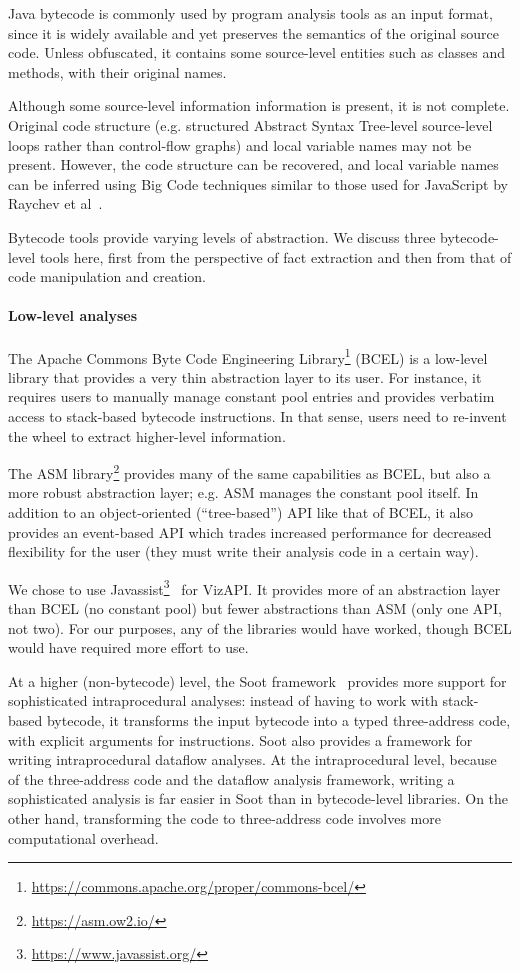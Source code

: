 Java bytecode is commonly used by program analysis tools as an input
format, since it is widely available and yet preserves the semantics
of the original source code. Unless obfuscated, it contains some
source-level entities such as classes and methods, with their original
names.

Although some source-level information information is present, it is
not complete. Original code structure (e.g. structured Abstract Syntax
Tree-level source-level loops rather than control-flow graphs) and
local variable names may not be present. However, the code structure
can be recovered, and local variable names can be inferred using Big
Code techniques similar to those used for JavaScript by Raychev et
al~\cite{raychev2016learning}.

Bytecode tools provide varying levels of abstraction. We discuss three
bytecode-level tools here, first from the perspective of fact extraction
and then from that of code manipulation and creation.

\paragraph{Low-level analyses}
The Apache Commons Byte Code Engineering Library\footnote{\url{https://commons.apache.org/proper/commons-bcel/}} (BCEL) is a low-level library that
provides a very thin abstraction layer to its user. For instance,
it requires users to manually manage constant pool entries and provides
verbatim access to stack-based bytecode instructions. In that sense,
users need to re-invent the wheel to extract higher-level information.

The ASM library\footnote{\url{https://asm.ow2.io/}} provides many of
the same capabilities as BCEL, but also a more robust
abstraction layer; e.g. ASM manages the constant pool
itself. In addition to an object-oriented (``tree-based'') API like
that of BCEL, it also provides an event-based API which trades increased
performance for decreased flexibility for the user (they must write
their analysis code in a certain way).

We chose to use
Javassist\footnote{\url{https://www.javassist.org/}}~\cite{chiba00:_load_struc_reflec_java}
for VizAPI. It provides more of an abstraction layer than BCEL (no
constant pool) but fewer abstractions than ASM (only one API, not
two). For our purposes, any of the libraries would have
worked, though BCEL would have required more effort to use. 

At a higher (non-bytecode) level, the Soot
framework~\cite{lam11:_soot_java} provides more support for
sophisticated intraprocedural analyses: instead of having to work with
stack-based bytecode, it transforms the input bytecode into a typed
three-address code, with explicit arguments for instructions. Soot
also provides a framework for writing intraprocedural dataflow
analyses.  At the intraprocedural level, because of the three-address
code and the dataflow analysis framework, writing a sophisticated
analysis is far easier in Soot than in bytecode-level libraries. On
the other hand, transforming the code to three-address code involves
more computational overhead.


